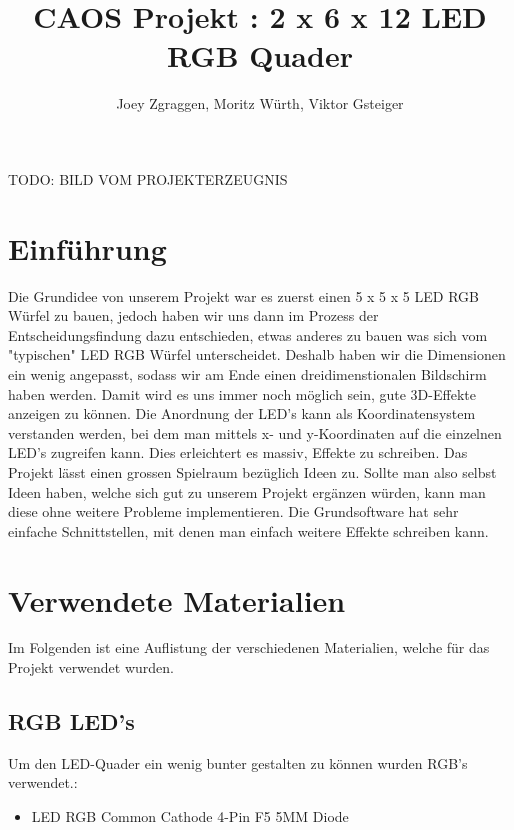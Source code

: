 \documentclass[12pt,a4paper]{article}
\title{\textbf{CAOS Projekt : 2 x 6 x 12 LED RGB Quader}}
\author{Joey Zgraggen, Moritz Würth, Viktor Gsteiger}
\begin{document}
\renewcommand\contentsname{Inhaltsverzeichnis}
\begin{titlepage}
\maketitle
TODO: BILD VOM PROJEKTERZEUGNIS
\end{titlepage}
\tableofcontents
\newpage

\section{Einführung}

Die Grundidee von unserem Projekt war es zuerst einen 5 x 5 x 5 LED RGB Würfel zu bauen, jedoch haben wir uns dann im Prozess der Entscheidungsfindung
dazu entschieden, etwas anderes zu bauen was sich vom "typischen" LED RGB Würfel unterscheidet.
Deshalb haben wir die Dimensionen ein wenig angepasst, sodass wir am Ende einen dreidimenstionalen Bildschirm haben werden. Damit wird es uns immer noch möglich sein, gute 3D-Effekte
anzeigen zu können. Die Anordnung der LED's kann als Koordinatensystem verstanden werden, bei dem man mittels x- und y-Koordinaten auf die einzelnen LED's zugreifen kann. Dies erleichtert es massiv, Effekte zu schreiben. 
Das Projekt lässt einen grossen Spielraum bezüglich Ideen zu. Sollte man also selbst Ideen haben, welche sich gut zu unserem Projekt ergänzen würden, kann man diese ohne weitere
Probleme implementieren. Die Grundsoftware hat sehr einfache Schnittstellen, mit denen man einfach weitere Effekte schreiben kann.


\section{Verwendete Materialien}

Im Folgenden ist eine Auflistung der verschiedenen Materialien, welche für das Projekt verwendet wurden.

\subsection{RGB LED's}

Um den LED-Quader ein wenig bunter gestalten zu können wurden RGB's verwendet.:

\begin{itemize}
    \item LED RGB Common Cathode 4-Pin F5 5MM Diode
\end{itemize}
\end{document}
